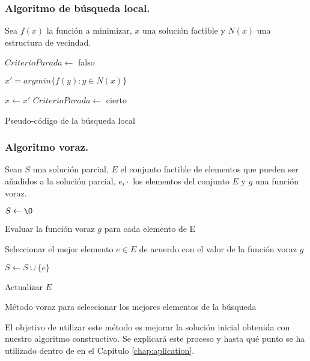 \subsubsection{Algoritmo de búsqueda local.} \label{subs:grasp2}

Sea $f(x)$ la función a minimizar, $x$ una solución factible y $N(x)$ una
estructura de vecindad.

\begin{algorithm}[H]
$CriterioParada \leftarrow$ falso

 {

$x' = arg min\{f(y): y \in N(x)\}$

 {$x \leftarrow x'$} {$CriterioParada \leftarrow$ cierto}
}
\caption{Pseudo-código de la búsqueda local}
\label{algo:grasp3}
\end{algorithm}
\subsubsection{Algoritmo voraz.} \label{subs:grasp3}

Sean $S$ una solución parcial, $E$ el conjunto factible de elementos que pueden 
ser añadidos a la solución parcial, $e_i·$ los elementos del conjunto $E$ y $g$
una función voraz. 

\begin{algorithm}[H]
$S \leftarrow \O$

   {
  Evaluar la función voraz $g$ para cada elemento de E
  
	Seleccionar el mejor elemento $e \in E$ de acuerdo con el valor de la función voraz $g$
  
	$S \leftarrow S\cup\{e\}$
  
	Actualizar $E$
}
\caption{Método voraz para seleccionar los mejores elementos de la búsqueda}
\label{algo:grasp4}
\end{algorithm}

El objetivo de utilizar este método es mejorar la solución inicial obtenida con
nuestro algoritmo constructivo. Se explicará este proceso y hasta qué punto se ha
utilizado dentro de \CSUO{} en el Capítulo \ref{chap:aplication}.
